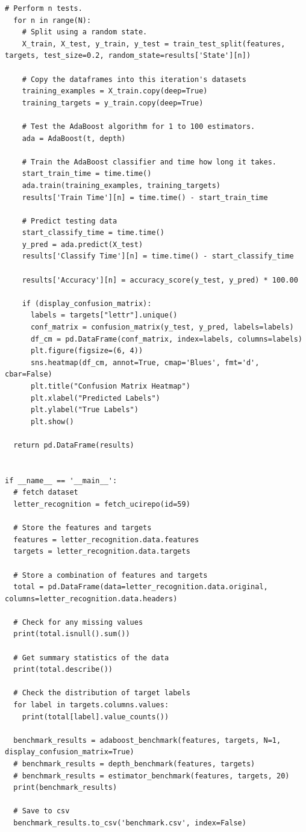 \documentclass[a4paper]{article}
\begin{document}
\begin{lstlisting}[basicstyle= \scriptsize]
  # Perform n tests.
  for n in range(N):
    # Split using a random state.
    X_train, X_test, y_train, y_test = train_test_split(features, targets, test_size=0.2, random_state=results['State'][n])

    # Copy the dataframes into this iteration's datasets
    training_examples = X_train.copy(deep=True)
    training_targets = y_train.copy(deep=True)

    # Test the AdaBoost algorithm for 1 to 100 estimators.
    ada = AdaBoost(t, depth) 

    # Train the AdaBoost classifier and time how long it takes.
    start_train_time = time.time()
    ada.train(training_examples, training_targets)
    results['Train Time'][n] = time.time() - start_train_time 

    # Predict testing data
    start_classify_time = time.time()
    y_pred = ada.predict(X_test)
    results['Classify Time'][n] = time.time() - start_classify_time

    results['Accuracy'][n] = accuracy_score(y_test, y_pred) * 100.00

    if (display_confusion_matrix):
      labels = targets["lettr"].unique()
      conf_matrix = confusion_matrix(y_test, y_pred, labels=labels)
      df_cm = pd.DataFrame(conf_matrix, index=labels, columns=labels)
      plt.figure(figsize=(6, 4))
      sns.heatmap(df_cm, annot=True, cmap='Blues', fmt='d', cbar=False)
      plt.title("Confusion Matrix Heatmap")
      plt.xlabel("Predicted Labels")
      plt.ylabel("True Labels")
      plt.show()

  return pd.DataFrame(results)


if __name__ == '__main__':
  # fetch dataset 
  letter_recognition = fetch_ucirepo(id=59) 

  # Store the features and targets
  features = letter_recognition.data.features
  targets = letter_recognition.data.targets

  # Store a combination of features and targets
  total = pd.DataFrame(data=letter_recognition.data.original, columns=letter_recognition.data.headers)

  # Check for any missing values
  print(total.isnull().sum())

  # Get summary statistics of the data
  print(total.describe())

  # Check the distribution of target labels
  for label in targets.columns.values:
    print(total[label].value_counts())

  benchmark_results = adaboost_benchmark(features, targets, N=1, display_confusion_matrix=True)
  # benchmark_results = depth_benchmark(features, targets)
  # benchmark_results = estimator_benchmark(features, targets, 20)
  print(benchmark_results)

  # Save to csv
  benchmark_results.to_csv('benchmark.csv', index=False)
\end{lstlisting}
\end{document}
